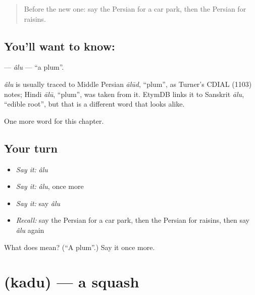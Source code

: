 \label{lesson:FA-C118-alu}



\begin{quote}
Before the new one: say the Persian for a car park, then the Persian for raisins.
\end{quote}

\subsection*{You'll want to know: }
\textbf{} — \emph{âlu} — \textquotedblleft{}a plum\textquotedblright{}.

\begin{cousinweb}
\emph{âlu} is usually traced to Middle Persian \emph{ālūd}, \textquotedblleft{}plum\textquotedblright{}, as Turner's CDIAL (1103) notes; Hindi \emph{ālū}, \textquotedblleft{}plum\textquotedblright{}, was taken from it. EtymDB links it to Sanskrit \emph{ālu}, \textquotedblleft{}edible root\textquotedblright{}, but that is a different word that looks alike.
\end{cousinweb}

\begin{grammarlens}[title={What you've built}]
One more word for this chapter.
\end{grammarlens}

\subsection*{Your turn}
\begin{itemize}
\raggedright
  \item \emph{Say it:} \emph{âlu}
  \item \emph{Say it:} \emph{âlu}, once more
  \item \emph{Say it:} say \emph{âlu}
  \item \emph{Recall:} say the Persian for a car park, then the Persian for raisins, then say \emph{âlu} again
\end{itemize}

\begin{tcolorbox}[breakable,colback=teal!4,colframe=teal!35!black,title={Before you move on}]
What does  mean? (\textquotedblleft{}A plum\textquotedblright{}.) Say it once more.
\end{tcolorbox}
\section[\texorpdfstring{\fa{کدو} (kadu)}{کدو (kadu)}]{ (kadu) — a squash}

